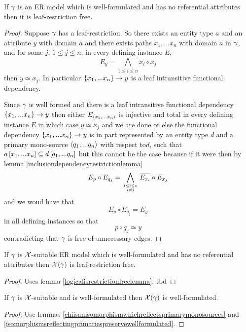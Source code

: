 \begin{lemma}
\label{logicalisrestrictionfreelemma}
If $\gamma$ is an ER model which is well-formulated and has no referential attributes 
then it is leaf-restriction free.
\end{lemma}
\begin{proof}
Suppose $\gamma$ has a leaf-restriction. So there exists an
entity type $a$ and an attribute $y$ with domain $a$ and there 
exists paths $x_1,...x_n$   with domain
$a$ in $\gamma$,  and for some $j$, $1 \leq j \leq n$, in every defining instance $E$,  
$$E_y = \bigwedge_{1 \leq i \leq n}{\overline{x_i}} \circ x_j$$then $y \simeq x_j$. In particular
$\left\{x_1,...x_n\right\} \rightarrow y$ is a leaf intransitive functional dependency. 

Since $\gamma$ is well formed  and there is a leaf intransitive functional dependency $\left\{x_1,...x_n\right\} \rightarrow y$ then either $E_{\langle x_1,...x_n\rangle}$ is injective and total in every defining instance $E$  in which case $y \simeq x_j$  and we are done  or else the functional dependency $\left\{x_1,...x_n\right\} \rightarrow y$   is in part represented by  an entity type $d$ and a primary mono-source $\langle q_1,...q_n\rangle$ with respect to$d$, such that $a\left[x_1,...x_n\right]\subseteq d\left[q_1,...q_n\right]$ but this cannot be the case because if it were then by lemma \ref{inclusiondependencyrestrictionlemma}
$$E_p \circ E_{q_j} = \bigwedge\limits_{\genfrac{}{}{0pt}{}{1 \leq i \leq n}{ i \neq j}}{\overline{E_{x_i}}}\circ E_{x_j}$$
and we woud have that
$$E_p \circ E_{q_j} = E_y$$
in all defining instances so that
$$p \circ q_j \simeq y$$
contradicting that $\gamma$ is free of unnecessary edges. 
\end{proof}

\begin{lemma}
\label{restrictioncarrythroughlemma}
If $\gamma$ is $\mathcal{X}$-suitable ER model which is well-formulated and has no referential attributes 
then $\mathcal{X}(\gamma)$ is leaf-restriction free.
\end{lemma}
\begin{proof}
Uses lemma  \ref{logicalisrestrictionfreelemma}.
\vspace{0.5cm}
tbd
\end{proof}



\begin{lemma}
\label{wfcarrythroughlemma}
If  $\gamma$ is $\mathcal{X}$-suitable and is well-formulated then  $\mathcal{X}(\gamma)$ is well-formulated. 
\end{lemma}
\begin{proof}
Use lemmas \ref{chiisanisomorphismwhichreflectsprimarymonosources} and \ref{isomorphismsreflectingprimariespreservewellformulated}.
\end{proof}


